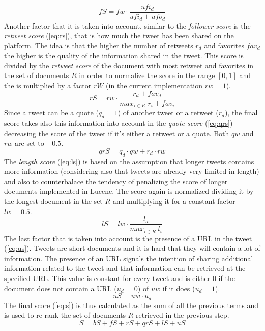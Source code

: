 \begin{equation}\label{eq:fs}
    fS = fw \cdot \frac{ufi_d}{ufi_d + ufo_d}
\end{equation}
Another factor that it is taken into account, similar to the \textit{follower score} is the \textit{retweet score} (\ref{eq:rs}), that is how much the tweet has been shared on the platform. The idea is that the higher the number of retweets $r_d$ and favorites $fav_d$ the higher is the quality of the information shared in the tweet. This score is divided by the \textit{retweet score} of the document with most retweet and favorites in the set of documents $R$ in order to normalize the score in the range $[0, 1]$ and the is multiplied by a factor $rW$ (in the current implementation $rw = 1$).
\begin{equation}\label{eq:rs}
    rS = rw \cdot \frac{r_d + fav_d}{max_{i \in R}{\; r_i + fav_i}}
\end{equation}
Since a tweet can be a quote ($q_d = 1$) of another tweet or a retweet ($r_d$), the final score takes also this information into account in the \textit{quote score} (\ref{eq:qrs}) decreasing the score of the tweet if it's either a retweet or a quote. Both $qw$ and $rw$ are set to $-0.5$.
\begin{equation}\label{eq:qrs}
    qrS = q_d \cdot qw + r_d \cdot rw
\end{equation}
The \textit{length score} (\ref{eq:ls}) is based on the assumption that longer tweets contains more information (considering also that tweets are already very limited in length) and also to counterbalace the tendency of penalizing the score of longer documents implemented in Lucene. The score again is normalized dividing it by the longest document in the set $R$ and multiplying it for a constant factor $lw = 0.5$.
\begin{equation}\label{eq:ls}
    lS = lw \cdot \frac{l_d}{max_{ i \in R}{\; l_i}}
\end{equation}
The last factor that is taken into account is the presence of a URL in the tweet (\ref{eq:us}). Tweets are short documents and it is hard that they will contain a lot of information. The presence of an URL signals the intention of sharing additional information related to the tweet and that information can be retrieved at the specified URL. This value is constant for every tweet and is either 0 if the document does not contain a URL ($u_d$ = 0) of $uw$ if it does ($u_d = 1$).
\begin{equation}\label{eq:us}
    uS = uw \cdot u_d
\end{equation}
The final score (\ref{eq:s}) is thus calculated as the sum of all the previous terms and is used to re-rank the set of documents $R$ retrieved in the previous step.
\begin{equation}\label{eq:s}
    S = bS + fS + rS + qrS + lS + uS
\end{equation}

